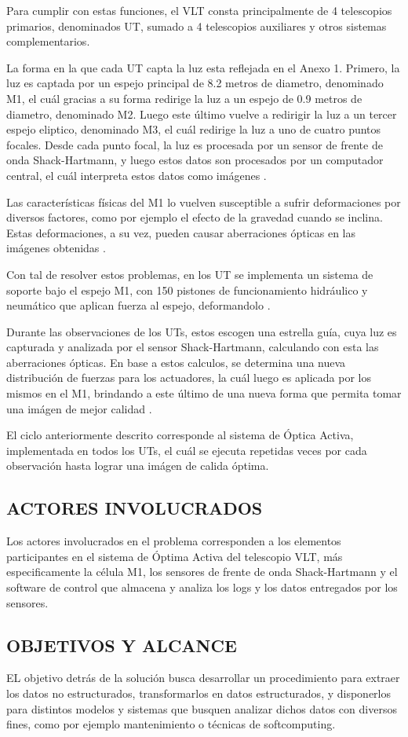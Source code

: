Para cumplir con estas funciones, el VLT consta principalmente de 4 telescopios primarios, denominados UT, sumado a 4 telescopios auxiliares y otros sistemas complementarios\cite{eso1998vlt}.

La forma en la que cada UT capta la luz esta reflejada en el Anexo 1. Primero, la luz es captada por un espejo principal de 8.2 metros de diametro, denominado M1, el cuál gracias a su forma redirige la luz a un espejo de 0.9 metros de diametro, denominado M2. Luego este último vuelve a redirigir la luz a un tercer espejo eliptico, denominado M3, el cuál redirige la luz a uno de cuatro puntos focales. Desde cada punto focal, la luz es procesada por un sensor de frente de onda Shack-Hartmann, y luego estos datos son procesados por un computador central, el cuál interpreta estos datos como imágenes \cite{eso1998vlt}.

Las características físicas del M1 lo vuelven susceptible a sufrir deformaciones por diversos factores, como por ejemplo el efecto de la gravedad cuando se inclina. Estas deformaciones, a su vez, pueden causar aberraciones ópticas en las imágenes obtenidas \cite{wilson1987active}.

Con tal de resolver estos problemas, en los UT se implementa un sistema de soporte bajo el espejo M1, con 150 pistones de funcionamiento hidráulico y neumático que aplican fuerza al espejo, deformandolo \cite{eso1998vlt}. 

Durante las observaciones de los UTs, estos escogen una estrella guía, cuya luz es capturada y analizada por el sensor Shack-Hartmann, calculando con esta las aberraciones ópticas. En base a estos calculos, se determina una nueva distribución de fuerzas para los actuadores, la cuál luego es aplicada por los mismos en el M1, brindando a este último de una nueva forma que permita tomar una imágen de mejor calidad \cite{eso1998vlt}. 

El ciclo anteriormente descrito corresponde al sistema de Óptica Activa, implementada en todos los UTs, el cuál se ejecuta repetidas veces por cada observación hasta lograr una imágen de calida óptima\cite{eso1998vlt}.

\subsection{ACTORES INVOLUCRADOS}

Los actores involucrados en el problema corresponden a los elementos participantes en el sistema de Óptima Activa del telescopio VLT, más especificamente la célula M1, los sensores de frente de onda Shack-Hartmann y el software de control que almacena y analiza los logs y los datos entregados por los sensores\cite{eso2011vlt}.

\subsection{OBJETIVOS Y ALCANCE}

EL objetivo detrás de la solución busca desarrollar un procedimiento para extraer los datos no estructurados, transformarlos en datos estructurados, y disponerlos para distintos modelos y sistemas
que busquen analizar dichos datos con diversos fines, como por ejemplo mantenimiento o técnicas de softcomputing.
